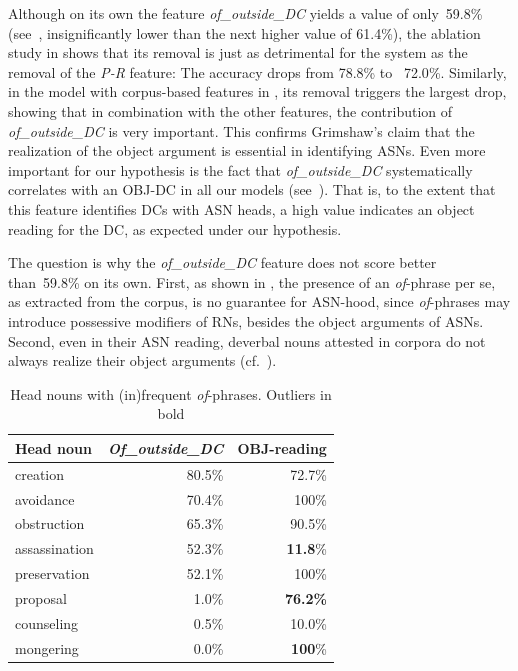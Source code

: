 \documentclass[output=paper]{langsci/langscibook}
\begin{document}
Although on its own the feature \textit{of\_outside\_DC} yields a value of only~59.8\% (see~, insignificantly lower than the  {next higher value of} 61.4\%), the ablation study in  shows that its removal is just as detrimental for the system as the removal of the \textit{P-R} feature: The accuracy drops from 78.8\% to~ {72.0}\%. Similarly, in the model with corpus-based features in , its removal triggers the largest drop, showing that in combination with the other features, the contribution of \textit{of\_outside\_DC} is very important. This confirms Grimshaw's claim that the realization of the object argument is essential in identifying ASNs. Even more important for our hypothesis is the fact that \textit{\textit{of}\_outside\_DC} systematically correlates with an OBJ-DC in all our models (see~). That is, to the extent that this feature identifies DCs with ASN heads, a high value indicates an object reading for the DC, as expected under our hypothesis.


The question is why the \textit{of\_outside\_DC} feature  does not score better than~59.8\% on its own.  {First, as shown in , the presence of an \textit{of}-phrase per se, as extracted from the corpus, is no guarantee for ASN-hood, since \textit{of}-phrases may introduce possessive modifiers of RNs, besides the object arguments of ASNs. Second,} even in their ASN reading, deverbal nouns attested in corpora do not always realize their object arguments (cf.~\cite{grimm:mcnally:13}). 

  
\begin{table}
\caption{\label{tab:ex:of:phrases} Head nouns with (in)frequent \textit{of}-phrases. Outliers in bold}
{\small \begin{tabular}{|l|r|r|}
\hline
\textbf{Head noun}&\textbf{\textit{Of\_outside\_DC}}&\textbf{OBJ-reading}\\
\hline
creation&80.5\%&72.7\%\\ \hline
avoidance&70.4\%&100\%\\\hline
obstruction&65.3\%&90.5\%\\   \hline
assassination&52.3\%&\textbf{11.8}\%\\ \hline
preservation&52.1\%&100\%\\  \hline \hline
proposal&1.0\%&\textbf{76.2\%}\\ \hline
counseling&0.5\%&10.0\%\\\hline
mongering&0.0\%&\textbf{100}\%\\\hline
\end{tabular}}
\end{table}
\end{document}

